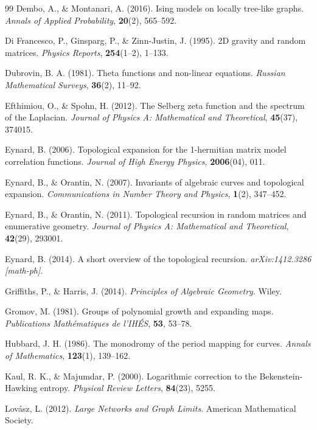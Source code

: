 \documentclass[12pt]{article}
\theoremstyle{definition}
\begin{document}
\begin{thebibliography}{99}
 Dembo, A., \& Montanari, A. (2016). Ising models on locally tree-like graphs. \textit{Annals of Applied Probability}, \textbf{20}(2), 565--592.

 Di Francesco, P., Ginsparg, P., \& Zinn-Justin, J. (1995). 2D gravity and random matrices. \textit{Physics Reports}, \textbf{254}(1--2), 1--133.

 Dubrovin, B. A. (1981). Theta functions and non-linear equations. \textit{Russian Mathematical Surveys}, \textbf{36}(2), 11--92.

 Efthimiou, O., \& Spohn, H. (2012). The Selberg zeta function and the spectrum of the Laplacian. \textit{Journal of Physics A: Mathematical and Theoretical}, \textbf{45}(37), 374015.

 Eynard, B. (2006). Topological expansion for the 1-hermitian matrix model correlation functions. \textit{Journal of High Energy Physics}, \textbf{2006}(04), 011.

 Eynard, B., \& Orantin, N. (2007). Invariants of algebraic curves and topological expansion. \textit{Communications in Number Theory and Physics}, \textbf{1}(2), 347--452.

 Eynard, B., \& Orantin, N. (2011). Topological recursion in random matrices and enumerative geometry. \textit{Journal of Physics A: Mathematical and Theoretical}, \textbf{42}(29), 293001.

 Eynard, B. (2014). A short overview of the topological recursion. \textit{arXiv:1412.3286 [math-ph]}.

 Griffiths, P., \& Harris, J. (2014). \textit{Principles of Algebraic Geometry}. Wiley.

 Gromov, M. (1981). Groups of polynomial growth and expanding maps. \textit{Publications Math\'ematiques de l'IH\'ES}, \textbf{53}, 53--78.

 Hubbard, J. H. (1986). The monodromy of the period mapping for curves. \textit{Annals of Mathematics}, \textbf{123}(1), 139--162.

 Kaul, R. K., \& Majumdar, P. (2000). Logarithmic correction to the Bekenstein-Hawking entropy. \textit{Physical Review Letters}, \textbf{84}(23), 5255.

 Lov\'asz, L. (2012). \textit{Large Networks and Graph Limits}. American Mathematical Society.


\end{thebibliography}
\end{document}
